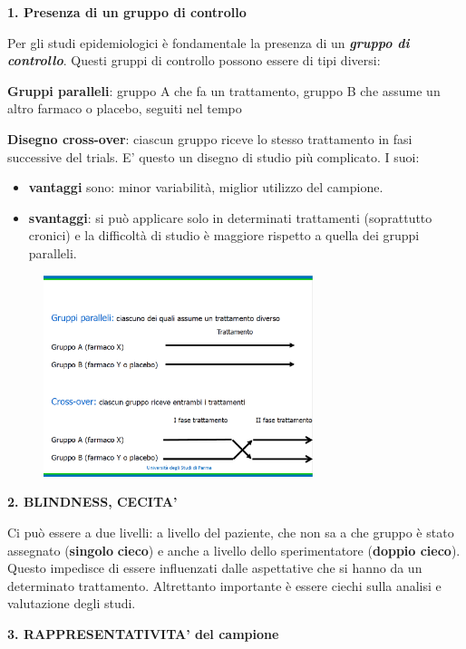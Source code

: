 \textbf{1. Presenza di un gruppo di controllo}

Per gli studi epidemiologici è fondamentale la presenza di un
\textbf{\emph{gruppo di controllo}}. Questi gruppi di controllo possono
essere di tipi diversi:

\textbf{Gruppi paralleli}: gruppo A che fa un trattamento, gruppo B che
assume un altro farmaco o placebo, seguiti nel tempo

\textbf{Disegno cross-over}: ciascun gruppo riceve lo stesso trattamento
in fasi successive del trials. E' questo un disegno di studio più
complicato. I suoi:

\begin{itemize}
\item
  \textbf{vantaggi} sono: minor variabilità, miglior utilizzo del
  campione.
\item
  \textbf{svantaggi}: si può applicare solo in determinati trattamenti
  (soprattutto cronici) e la difficoltà di studio è maggiore rispetto a
  quella dei gruppi paralleli.
\end{itemize}

\begin{figure}[!ht]
\centering
\includegraphics[width=0.7\textwidth]{05/image13.png}
\end{figure}

\textbf{2. BLINDNESS, CECITA'}

Ci può essere a due livelli: a livello del paziente, che non sa a che
gruppo è stato assegnato (\textbf{singolo} \textbf{cieco}) e anche a
livello dello sperimentatore (\textbf{doppio cieco}). Questo impedisce
di essere influenzati dalle aspettative che si hanno da un determinato
trattamento. Altrettanto importante è essere ciechi sulla analisi e
valutazione degli studi.

\textbf{3. RAPPRESENTATIVITA' del campione}

